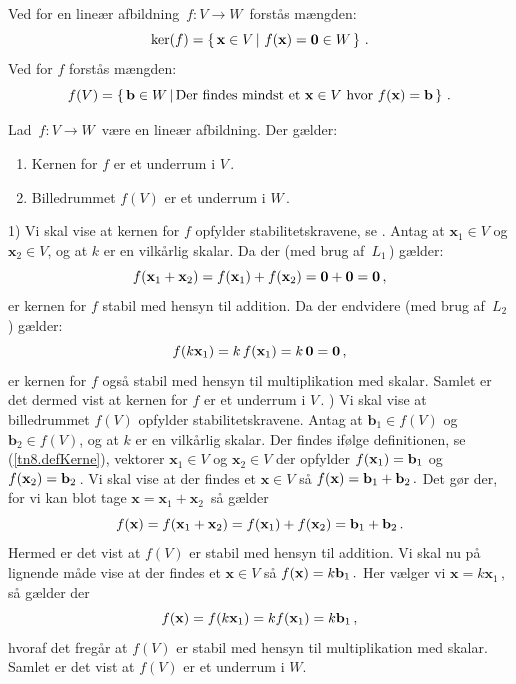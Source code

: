 \begin{definition}\label{tn8.defKerne}
Ved  for en lineær afbildning $\,f:V\rightarrow W\,$ forstås mængden:
\begin{equation}
\ker(f)=\left\{\,\mathbf x\in V\,|\,\,f(\mathbf x)=\bm{0}\in W\,\right\}\,.  
\end{equation}
Ved  for $f$ forstås mængden:  
\begin{equation}\label{tn8_bildrum}
f(V)=\left\{\,\mathbf b\in W\,|\,\mathrm{Der\,\,findes\,\,mindst\,\,et}\,\, \mathbf x \in V\,\,\mathrm{hvor} \,\,f(\mathbf x)=\mathbf{b}\,\right\}\,.
\end{equation}
\end{definition}

\begin{theorem}\label{tn8.thKernUrum}
Lad $\,f:V\rightarrow W\,$ være en lineær afbildning. Der gælder:
\begin{enumerate}
\item
Kernen for $f$ er et underrum i $V\,$.
\item
Billedrummet $f(V)$ er et underrum i $W\,$.  
\end{enumerate}
\end{theorem}

\begin{bevis}
1) Vi skal vise at kernen for $f$ opfylder stabilitetskravene, se . Antag at $\mathbf x_1 \in V$ og $\mathbf x_2 \in V$, og at $k$ er en vilkårlig skalar. Da der (med brug af $\,L_1\,$) gælder:
$$f(\mathbf x_1+\mathbf x_2)=f(\mathbf x_1)+f(\mathbf x_2)=\bm{0}+\bm{0}=\bm{0}\,,$$
er kernen for $f$ stabil med hensyn til addition. Da der endvidere (med brug af $\,L_2\,$) gælder:
$$
f(k\mathbf x_1)=k\,f(\mathbf x_1)=k\,\bm{0}=\bm{0}\,,$$
er kernen for $f$ også stabil med hensyn til multiplikation med skalar. Samlet er det dermed vist at kernen for $f$ er et underrum i $V\,$. ) Vi skal vise at billedrummet $f(V)$ opfylder stabilitetskravene. Antag at $\mathbf b_1 \in f(V)$ og $\mathbf b_2 \in f(V)$, og at $k$ er en vilkårlig skalar. Der findes ifølge definitionen, se (\ref{tn8.defKerne}), vektorer $\mathbf x_1\in V$ og $\mathbf x_2\in V$ der opfylder $f(\mathbf x_1)=\mathbf{b}_1$ og $f(\mathbf x_2)=\mathbf{b}_2\,$. Vi skal vise at der findes et $\mathbf x \in V$ så $f(\mathbf x)=\mathbf{b}_1+\mathbf{b}_2\,.$ Det gør der, for vi kan blot tage $\mathbf x=\mathbf x_1+\mathbf x_2\,$ så gælder
$$f(\mathbf x)=f(\mathbf x_1+\mathbf x_2)=f(\mathbf x_1)+f(\mathbf x_2)=\mathbf{b}_1+\mathbf{b}_2\,.
$$
Hermed er det vist at $f(V)$ er stabil med hensyn til addition. Vi skal nu på lignende måde vise at der findes et $\mathbf x \in V$ så $f(\mathbf x)=k\mathbf{b}_1\,.$ Her vælger vi $\mathbf x = k\mathbf x_1\,,$ så gælder der 
$$f(\mathbf x)=f(k \mathbf x_1)=kf(\mathbf x_1)=k\mathbf{b}_1\,,$$
hvoraf det fregår at $f(V)$ er stabil med hensyn til multiplikation med skalar. Samlet er det vist at $f(V)$ er et underrum i $W$.
\end{bevis}

